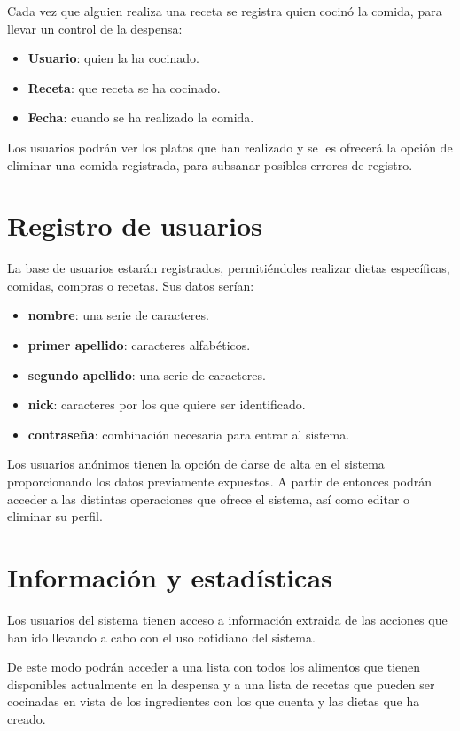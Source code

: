 \documentclass[a4paper,12pt]{report}
\begin{document}
Cada vez que alguien realiza una receta se registra quien cocinó la
comida, para llevar un control de la despensa:
\begin{itemize}
\item \textbf{Usuario}: quien la ha cocinado.
\item \textbf{Receta}: que receta se ha cocinado.
\item \textbf{Fecha}: cuando se ha realizado la comida.
\end{itemize}

\vspace{0.2cm}
Los usuarios podrán ver los platos que han realizado y se les
ofrecerá la opción de eliminar una comida registrada, para subsanar
posibles errores de registro.

\newpage

\section{Registro de usuarios}
\label{sec-1-3}
La base de usuarios estarán registrados, permitiéndoles realizar
dietas específicas, comidas, compras o recetas. Sus datos serían:
\begin{itemize}
\item \textbf{nombre}: una serie de caracteres.
\item \textbf{primer apellido}: caracteres alfabéticos.
\item \textbf{segundo apellido}:  una serie de caracteres.
\item \textbf{nick}: caracteres por los que quiere ser identificado.
\item \textbf{contraseña}: combinación necesaria para entrar al sistema.
\end{itemize}

\vspace{0.2cm}
Los usuarios anónimos tienen la opción de darse de alta en el
sistema proporcionando los datos previamente expuestos. A partir de
entonces podrán acceder a las distintas operaciones que ofrece el
sistema, así como editar o eliminar su perfil.


\section{Información y estadísticas}
\label{sec-1-4}
Los usuarios del sistema tienen acceso a información extraida de
las acciones que han ido llevando a cabo con el uso cotidiano del
sistema.

De este modo podrán acceder a una lista con todos los alimentos que
tienen disponibles actualmente en la despensa y a una lista de
recetas que pueden ser cocinadas en vista de los ingredientes con
los que cuenta y las dietas que ha creado.
\end{document}
